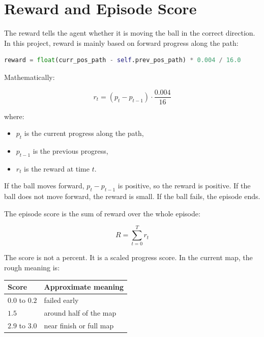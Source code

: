 \documentclass[11pt]{article}
\begin{document}
\section{Reward and Episode Score}

The reward tells the agent whether it is moving the ball in the correct direction. In this project, reward is mainly based on forward progress along the path:

\begin{lstlisting}[language=Python]
reward = float(curr_pos_path - self.prev_pos_path) * 0.004 / 16.0
\end{lstlisting}

Mathematically:

\begin{equation}
r_t = (p_t - p_{t-1}) \cdot \frac{0.004}{16}
\end{equation}

where:

\begin{itemize}[leftmargin=*]
  \item $p_t$ is the current progress along the path,
  \item $p_{t-1}$ is the previous progress,
  \item $r_t$ is the reward at time $t$.
\end{itemize}

If the ball moves forward, $p_t - p_{t-1}$ is positive, so the reward is positive. If the ball does not move forward, the reward is small. If the ball fails, the episode ends.

The episode score is the sum of reward over the whole episode:

\begin{equation}
R = \sum_{t=0}^{T} r_t
\end{equation}

The score is not a percent. It is a scaled progress score. In the current map, the rough meaning is:

\begin{center}
\begin{tabular}{ll}
\toprule
Score & Approximate meaning \\
\midrule
$0.0$ to $0.2$ & failed early \\
$1.5$ & around half of the map \\
$2.9$ to $3.0$ & near finish or full map \\
\bottomrule
\end{tabular}
\end{center}
\end{document}
